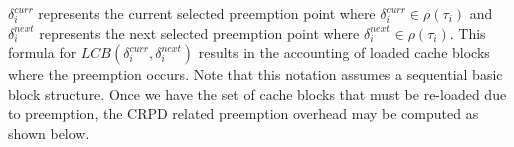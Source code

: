 \noindent
\begin{math}\delta_{i}^{curr}\end{math} represents the current selected preemption point where \begin{math}\delta_{i}^{curr} \in \rho(\tau_{i})\end{math} and \begin{math}\delta_{i}^{next}\end{math} represents the next selected preemption point where \begin{math}\delta_{i}^{next} \in \rho(\tau_{i})\end{math}.  This formula for \begin{math}\textit{LCB}(\delta_{i}^{curr},\delta_{i}^{next})\end{math} results in the accounting of loaded cache blocks where the preemption occurs.  Note that this notation assumes a sequential basic block structure. Once we have the set of cache blocks that must be re-loaded due to preemption, the CRPD related preemption overhead may be computed as shown below.
